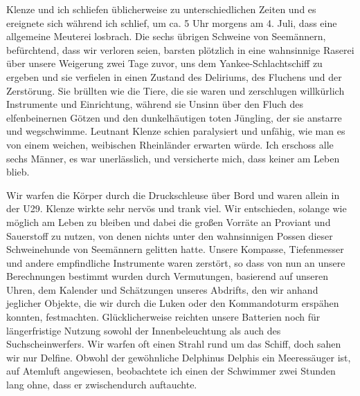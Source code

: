 \documentclass[a4paper]{memoir}
\begin{document}
Klenze und ich schliefen üblicherweise zu unterschiedlichen Zeiten und es ereignete sich während ich schlief, um ca. 5 Uhr morgens am 4. Juli, dass eine allgemeine Meuterei losbrach. Die sechs übrigen Schweine von Seemännern, befürchtend, dass wir verloren seien, barsten plötzlich in eine wahnsinnige Raserei über unsere Weigerung zwei Tage zuvor, uns dem Yankee-Schlachtschiff zu ergeben und sie verfielen in einen Zustand des Deliriums, des Fluchens und der Zerstörung. Sie brüllten wie die Tiere, die sie waren und zerschlugen willkürlich Instrumente und Einrichtung, während sie Unsinn über den Fluch des elfenbeinernen Götzen und den dunkelhäutigen toten Jüngling, der sie anstarre und wegschwimme. Leutnant Klenze schien paralysiert und unfähig, wie man es von einem weichen, weibischen Rheinländer erwarten würde. Ich erschoss alle sechs Männer, es war unerlässlich, und versicherte mich, dass keiner am Leben blieb.

Wir warfen die Körper durch die Druckschleuse über Bord und waren allein in der U29. Klenze wirkte sehr nervös und trank viel. Wir entschieden, solange wie möglich am Leben zu bleiben und dabei die großen Vorräte an Proviant und Sauerstoff zu nutzen, von denen nichts unter den wahnsinnigen Possen dieser Schweinehunde von Seemännern gelitten hatte. Unsere Kompasse, Tiefenmesser und andere empfindliche Instrumente waren zerstört, so dass von nun an unsere Berechnungen bestimmt wurden durch Vermutungen, basierend auf unseren Uhren, dem Kalender und Schätzungen unseres Abdrifts, den wir anhand jeglicher Objekte, die wir durch die Luken oder den Kommandoturm erspähen konnten, festmachten. Glücklicherweise reichten unsere Batterien noch für längerfristige Nutzung sowohl der Innenbeleuchtung als auch des Suchscheinwerfers. Wir warfen oft einen Strahl rund um das Schiff, doch sahen wir nur Delfine. Obwohl der gewöhnliche Delphinus Delphis ein Meeressäuger ist, auf Atemluft angewiesen, beobachtete ich einen der Schwimmer zwei Stunden lang ohne, dass er zwischendurch auftauchte.
\end{document}
